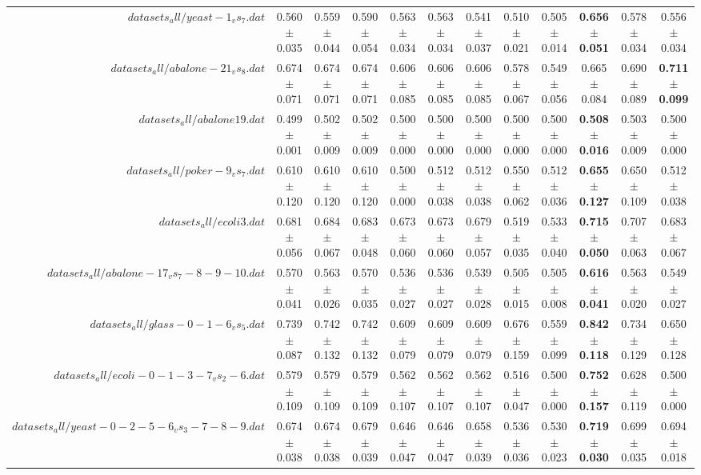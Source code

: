 \begin{table}[!ht]
{\begin{tabular}{r c c c c c c c c c c c}
$datasets_all/yeast-1_vs_7.dat$ & 0.560 $\pm$ 0.035 & 0.559 $\pm$ 0.044 & 0.590 $\pm$ 0.054 & 0.563 $\pm$ 0.034 & 0.563 $\pm$ 0.034 & 0.541 $\pm$ 0.037 & 0.510 $\pm$ 0.021 & 0.505 $\pm$ 0.014 & \textbf{0.656 $\pm$ 0.051} & 0.578 $\pm$ 0.034 & 0.556 $\pm$ 0.034 \\
$datasets_all/abalone-21_vs_8.dat$ & 0.674 $\pm$ 0.071 & 0.674 $\pm$ 0.071 & 0.674 $\pm$ 0.071 & 0.606 $\pm$ 0.085 & 0.606 $\pm$ 0.085 & 0.606 $\pm$ 0.085 & 0.578 $\pm$ 0.067 & 0.549 $\pm$ 0.056 & 0.665 $\pm$ 0.084 & 0.690 $\pm$ 0.089 & \textbf{0.711 $\pm$ 0.099} \\
$datasets_all/abalone19.dat$ & 0.499 $\pm$ 0.001 & 0.502 $\pm$ 0.009 & 0.502 $\pm$ 0.009 & 0.500 $\pm$ 0.000 & 0.500 $\pm$ 0.000 & 0.500 $\pm$ 0.000 & 0.500 $\pm$ 0.000 & 0.500 $\pm$ 0.000 & \textbf{0.508 $\pm$ 0.016} & 0.503 $\pm$ 0.009 & 0.500 $\pm$ 0.000 \\
$datasets_all/poker-9_vs_7.dat$ & 0.610 $\pm$ 0.120 & 0.610 $\pm$ 0.120 & 0.610 $\pm$ 0.120 & 0.500 $\pm$ 0.000 & 0.512 $\pm$ 0.038 & 0.512 $\pm$ 0.038 & 0.550 $\pm$ 0.062 & 0.512 $\pm$ 0.036 & \textbf{0.655 $\pm$ 0.127} & 0.650 $\pm$ 0.109 & 0.512 $\pm$ 0.038 \\
$datasets_all/ecoli3.dat$ & 0.681 $\pm$ 0.056 & 0.684 $\pm$ 0.067 & 0.683 $\pm$ 0.048 & 0.673 $\pm$ 0.060 & 0.673 $\pm$ 0.060 & 0.679 $\pm$ 0.057 & 0.519 $\pm$ 0.035 & 0.533 $\pm$ 0.040 & \textbf{0.715 $\pm$ 0.050} & 0.707 $\pm$ 0.063 & 0.683 $\pm$ 0.067 \\
$datasets_all/abalone-17_vs_7-8-9-10.dat$ & 0.570 $\pm$ 0.041 & 0.563 $\pm$ 0.026 & 0.570 $\pm$ 0.035 & 0.536 $\pm$ 0.027 & 0.536 $\pm$ 0.027 & 0.539 $\pm$ 0.028 & 0.505 $\pm$ 0.015 & 0.505 $\pm$ 0.008 & \textbf{0.616 $\pm$ 0.041} & 0.563 $\pm$ 0.020 & 0.549 $\pm$ 0.027 \\
$datasets_all/glass-0-1-6_vs_5.dat$ & 0.739 $\pm$ 0.087 & 0.742 $\pm$ 0.132 & 0.742 $\pm$ 0.132 & 0.609 $\pm$ 0.079 & 0.609 $\pm$ 0.079 & 0.609 $\pm$ 0.079 & 0.676 $\pm$ 0.159 & 0.559 $\pm$ 0.099 & \textbf{0.842 $\pm$ 0.118} & 0.734 $\pm$ 0.129 & 0.650 $\pm$ 0.128 \\
$datasets_all/ecoli-0-1-3-7_vs_2-6.dat$ & 0.579 $\pm$ 0.109 & 0.579 $\pm$ 0.109 & 0.579 $\pm$ 0.109 & 0.562 $\pm$ 0.107 & 0.562 $\pm$ 0.107 & 0.562 $\pm$ 0.107 & 0.516 $\pm$ 0.047 & 0.500 $\pm$ 0.000 & \textbf{0.752 $\pm$ 0.157} & 0.628 $\pm$ 0.119 & 0.500 $\pm$ 0.000 \\
$datasets_all/yeast-0-2-5-6_vs_3-7-8-9.dat$ & 0.674 $\pm$ 0.038 & 0.674 $\pm$ 0.038 & 0.679 $\pm$ 0.039 & 0.646 $\pm$ 0.047 & 0.646 $\pm$ 0.047 & 0.658 $\pm$ 0.039 & 0.536 $\pm$ 0.036 & 0.530 $\pm$ 0.023 & \textbf{0.719 $\pm$ 0.030} & 0.699 $\pm$ 0.035 & 0.694 $\pm$ 0.018 \\

\end{tabular}}
\end{table}

